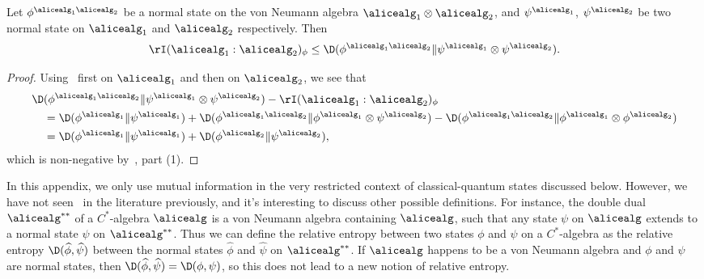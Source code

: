 \begin{proposition}\label{prop:divergence_gibbs_inequality}
	Let $\phi^{\alicealg_1 \alicealg_2}$ be a normal state on the von Neumann algebra $\alicealg_1 \otimes \alicealg_2$, and $\psi^{\alicealg_1}$, $\psi^{\alicealg_2}$ be two normal state on $\alicealg_1$ and $\alicealg_2$ respectively. Then
	\begin{equation*}
		\rI(\alicealg_1 :\alicealg_2)_{\phi} \leq \D (\phi^{\alicealg_1 \alicealg_2} \| \psi^{\alicealg_1} \otimes  \psi^{\alicealg_2}).
	\end{equation*}
\end{proposition}
\begin{proof}
	Using~ first on $\alicealg_1$ and then on $\alicealg_2$, we see that
	\begin{align*}
		\D & (\phi^{\alicealg_1 \alicealg_2}  \| \psi^{\alicealg_1} \otimes  \psi^{\alicealg_2} )	- \rI(\alicealg_1 :\alicealg_2)_{\phi} \\ 
		&= \D (\phi^{\alicealg_1} \| \psi^{\alicealg_1}) + \D (\phi^{\alicealg_1 \alicealg_2}\| \phi^{\alicealg_1} \otimes  \psi^{\alicealg_2} ) - \D (\phi^{\alicealg_1 \alicealg_2} \| \phi^{\alicealg_1} \otimes  \phi^{\alicealg_2} )	\\
		&= \D (\phi^{\alicealg_1} \| \psi^{\alicealg_1}) + \D (\phi^{\alicealg_2} \| \psi^{\alicealg_2}), 
	\end{align*}
	which is non-negative by~, part (1). 
\end{proof}

In this appendix, we only use mutual information in the very restricted context of classical-quantum states discussed below. However, 
we have not seen~ in the literature previously, and it's interesting to discuss other possible definitions. 
For instance, the double dual $\alicealg^{**}$ of a $C^*$-algebra $\alicealg$ is a von Neumann algebra containing $\alicealg$, such that any state $\psi$ on $\alicealg$ extends to a normal state $\widehat{\psi}$ on $\alicealg^{**}$. Thus we can define the relative entropy between two states $\phi$ and $\psi$ on a $C^*$-algebra as the relative entropy $\D(\widehat{\phi}, \widehat{\psi})$ between the normal states $\widehat{\phi}$ and $\widehat{\psi}$ on $\alicealg^{**}$. If $\alicealg$ happens to be a von Neumann algebra and $\phi$ and $\psi$ are normal states, then $\D(\widehat{\phi},\widehat{\psi}) = \D(\phi,\psi)$, so this does not lead to a new notion of relative entropy. 

